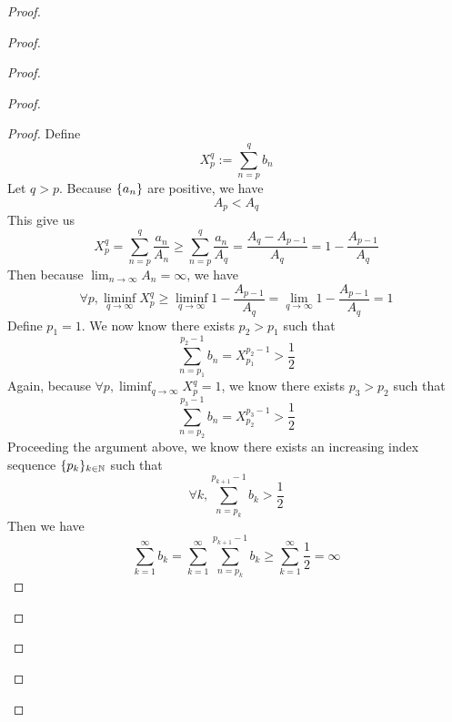 \documentclass{report}
\begin{document}
\begin{proof}
\begin{proof}
\begin{proof}
\begin{proof}
\begin{proof}
Define
\begin{equation}
X^q_p:=\sum_{n=p}^q b_n
\end{equation}
Let $q>p$. Because  $\{ a_n \}$ are positive, we have 
\begin{equation}
A_p<A_q
\end{equation}
This give us
\begin{equation}
X_p^q=\sum_{n=p}^q \frac{a_n}{A_n}\geq \sum_{n=p}^q \frac{a_n}{A_q}=\frac{A_q-A_{p-1}}{A_q}=1-\frac{A_{p-1}}{A_q}
\end{equation}
Then because $\lim_{n\to\infty}A_n=\infty$, we have
\begin{equation}
\forall p,\liminf_{q\to\infty}X_p^q\geq \liminf_{q\to\infty} 1-\frac{A_{p-1}}{A_q} =\lim_{q\to\infty}1-\frac{A_{p-1}}{A_q}=1
\end{equation}
Define $p_1=1$. We now know there exists $p_2>p_1$ such that
\begin{equation}
\sum_{n=p_1}^{p_2-1} b_n= X_{p_1}^{p_2-1}>\frac{1}{2}
\end{equation}
Again, because $\forall p,\liminf_{q\to\infty} X_p^q=1$, we know there exists $p_3>p_2$ such that
 \begin{equation}
\sum_{n=p_2}^{p_3-1} b_n=X_{p_2}^{p_3-1} >\frac{1}{2}
\end{equation}
Proceeding the argument above, we know there exists an increasing index sequence $\{ p_k \}_{k\in\mathbb{N}}$ such that 
\begin{equation}
\forall k,\sum_{n=p_k}^{p_{k+1}-1} b_k>\frac{1}{2}
\end{equation}
Then we have
\begin{equation}
\sum_{k=1}^\infty b_k=  \sum_{k=1}^\infty \sum_{n=p_k}^{p_{k+1}-1} b_k\geq \sum_{k=1}^\infty \frac{1}{2}=\infty
\end{equation}

\end{proof}


\end{proof}
\end{proof}
\end{proof}
\end{proof}
\end{document}
